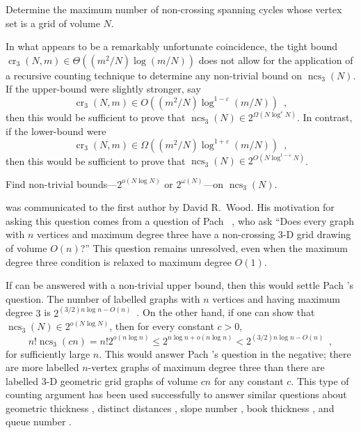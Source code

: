 \documentclass{patmorin}
\newcommand{\n}{N}
\DeclareMathOperator{\crs}{cr}
\DeclareMathOperator{\ncs}{ncs}
\begin{document}
\begin{op}
  Determine the maximum number of non-crossing spanning cycles whose
  vertex set is a grid of volume $\n$.
\end{op}

In what appears to be a remarkably unfortunate coincidence, the tight
bound $\crs_3(\n,m)\in \Theta((m^2/\n)\log (m/\n))$ does not allow for the
application of a recursive counting technique to determine any non-trivial
bound on $\ncs_3(\n)$.  If the upper-bound were slightly stronger, say
\[
   \crs_3(\n,m)\in O((m^2/\n)\log^{1-\varepsilon}(m/\n)) \enspace ,
\]
then this would be sufficient to prove that
$\ncs_3(\n)\in2^{\Omega(\n\log^{\varepsilon}\n)}$.  In contrast, if the
lower-bound were
\[
  \crs_3(\n,m)\in \Omega((m^2/\n)\log^{1+\varepsilon}(m/\n)) \enspace ,
\]
then this would be sufficient to prove that
$\ncs_3(\n)\in2^{O(\n\log^{1-\varepsilon}\n)}$.

\begin{op}[Wood]
  Find non-trivial bounds---$2^{o(\n\log\n)}$ or $2^{\omega(\n)}$---on
  $\ncs_3(\n)$.
\end{op}

 was communicated to the first author by David R.\
Wood.  His motivation for asking this question comes from a question of
Pach \etal~\cite{pach.thiele.ea:three-dimensional}, who ask ``Does every
graph with $n$ vertices and maximum degree three have a non-crossing
3-D grid drawing of volume $O(n)$?''  This question remains unresolved,
even when the maximum degree three condition is relaxed to maximum
degree $O(1)$.

If  can be answered with a  non-trivial upper bound,
then this would settle Pach \etal's question.  The number of labelled
graphs with $n$ vertices and having maximum degree $3$ is $2^{(3/2)n\log
n - O(n)}$~\cite[Appendix~A]{barat.matousek.ea:bounded-degree}. On the
other hand, if one can show that $\ncs_3(\n)\in 2^{o(\n\log\n)}$, then
for every constant $c>0$,
\[
   n!\ncs_3(cn) = n!2^{o(n\log n)} \le 2^{n\log n + o(n\log n)}
   < 2^{(3/2)n\log n - O(n)} \enspace ,
\]
for sufficiently large $n$. This would answer Pach \etal's question
in the negative; there are more labelled $n$-vertex graphs of
maximum degree three than there are labelled 3-D geometric grid
graphs of volume $cn$ for any constant $c$.   This type of counting
argument has been used successfully to answer similar questions
about geometric thickness \cite{barat.matousek.ea:bounded-degree},
distinct distances \cite{carmi.dujmovic.ea:distinct}, slope number
\cite{pach.palvolgyi:bounded}, book thickness \cite{malitz:graphs},
and queue number \cite{malitz:graphs,wood:bounded}.
\end{document}
